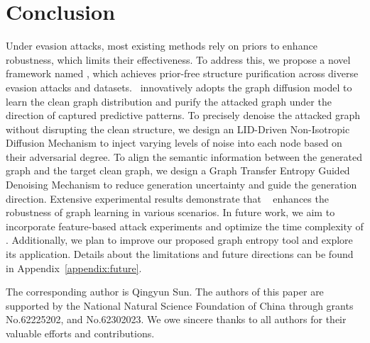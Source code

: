 \section{Conclusion}
Under evasion attacks, most existing methods rely on priors to enhance robustness, which limits their effectiveness.  
To address this, we propose a novel framework named \ModelName, which achieves prior-free structure purification across diverse evasion attacks and datasets.
\ModelName\ innovatively adopts the graph diffusion model to learn the clean graph distribution and purify the attacked graph under the direction of captured predictive patterns.
To precisely denoise the attacked graph without disrupting the clean structure, we design an LID-Driven Non-Isotropic Diffusion Mechanism to inject varying levels of noise into each node based on their adversarial degree. To align the semantic information between the generated graph and the target clean graph, we design a Graph Transfer Entropy Guided Denoising Mechanism to reduce generation uncertainty and guide the generation direction. Extensive experimental results demonstrate that \ModelName~ enhances
the robustness of graph learning in various scenarios.
In future work, we aim to incorporate feature-based attack experiments and optimize the time complexity of \ModelName. Additionally, we plan to improve our proposed graph entropy tool and explore its application. Details about the limitations and future directions can be found in Appendix~\ref{appendix:future}.

\begin{acks}
    The corresponding author is Qingyun Sun. The authors of this paper are supported by the National Natural Science Foundation of China through grants No.62225202, and No.62302023. We owe sincere thanks to all authors for their valuable efforts and contributions.
\end{acks}